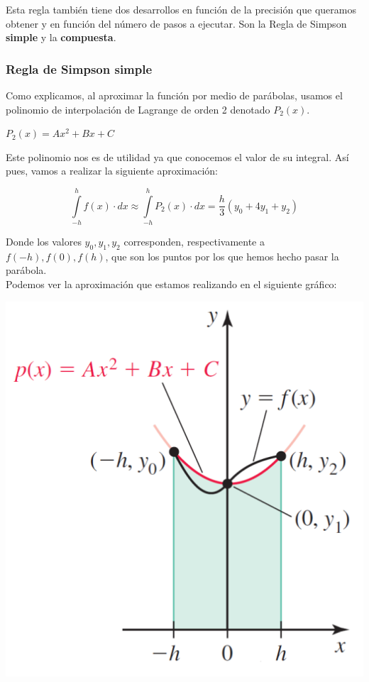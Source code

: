 \documentclass{article}
\begin{document}
	Esta regla también tiene dos desarrollos en función de la precisión que queramos obtener y en función del número de pasos a ejecutar. Son la Regla de Simpson \textbf{simple} y la \textbf{compuesta}.
	
		\subsubsection{Regla de Simpson simple}
			
			Como explicamos, al aproximar la función por medio de parábolas, usamos el polinomio de interpolación de Lagrange de orden 2 denotado $P_2(x)$.
			
			\begin{center}
				$P_2(x)=Ax^2+Bx+C$
			\end{center}
			
			Este polinomio nos es de utilidad ya que conocemos el valor de su integral. Así pues, vamos a realizar la siguiente aproximación:
			
			\begin{equation}\label{eq:rss}
				\int \limits_{-h}^{h} f(x) \cdot dx \approx 
				\int \limits_{-h}^{h} P_2(x) \cdot dx =
				\frac{h}{3}(y_0+4y_1+y_2)
			\end{equation}
			
			Donde los valores $y_0, y_1, y_2$ corresponden, respectivamente a $f(-h), f(0), f(h)$, que son los puntos por los que hemos hecho pasar la parábola.\\
			
			Podemos ver la aproximación que estamos realizando en el siguiente gráfico:
			
			\begin{center}
				\includegraphics[scale=0.55]{simple}
			\end{center}
			
\end{document}

